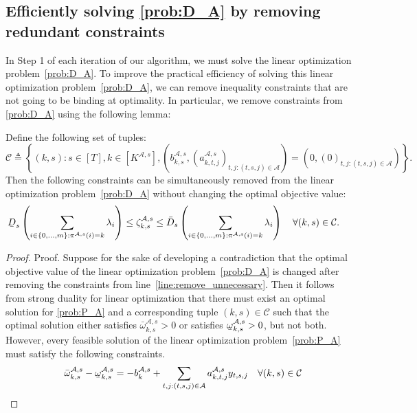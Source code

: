 \documentclass[nonblindrev,mnsc]{informs3} %
\newcommand{\ubar}[1]{\text{\b{$#1$}}}
\begin{document}
\begin{APPENDICES}
\subsection{Efficiently solving \eqref{prob:D_A} by removing redundant constraints}\label{app:solveDA} 
In Step 1 of each iteration of our algorithm, we must solve the linear optimization problem~\eqref{prob:D_A}. To improve the practical efficiency of solving this linear optimization problem~\eqref{prob:D_A}, we can remove inequality constraints that are not going to be binding at optimality. In particular, we remove constraints from \eqref{prob:D_A} using the following lemma:
\begin{lemma} \label{lem:remove_unnecessary}
Define the following set of tuples:
$$\mathcal{C} \triangleq \left \{(k,s): s \in [T], k \in [K^{\mathcal{A},s}], \left({b}^{\mathcal{A},s}_{ k,s}, \left( a^{\mathcal{A},s}_{k,t,j} \right)_{t,j: (t,s,j) \in \mathcal{A}}\right) = \left(0,(0)_{t,j: (t,s,j) \in \mathcal{A}} \right)  \right \}. $$
Then the following constraints can be simultaneously removed from the linear optimization problem~\eqref{prob:D_A} without changing the optimal objective value:
\begin{align}
    &  \ubar{D}_s \left( \sum_{i \in \{0,\ldots,m\}: \pi^{\mathcal{A},s}(i) = k} \lambda_{i} \right)   \le \zeta^{\mathcal{A},s}_{k,s}  \le \bar{D}_s \left( \sum_{i \in \{0,\ldots,m\}: \pi^{\mathcal{A},s}(i) = k} \lambda_{i} \right)  \quad  \forall  (k,s) \in \mathcal{C}.  \label{line:remove_unnecessary} 
\end{align}
\end{lemma}
\begin{proof}{Proof.}
Suppose for the sake of developing a contradiction that the optimal objective value of the linear optimization problem~\eqref{prob:D_A} is changed after removing the constraints from line~\eqref{line:remove_unnecessary}. Then it follows from strong duality for linear optimization that there must exist an optimal solution for \eqref{prob:P_A} and a corresponding tuple $(k,s) \in \mathcal{C}$ such that the optimal solution either satisfies $\bar{\omega}^{\mathcal{A},s}_{k,s} > 0$ or satisfies $\ubar{\omega}^{\mathcal{A},s}_{k,s}> 0$, but not both. However, every   feasible solution of the linear optimization problem~\eqref{prob:P_A} must satisfy  the following constraints. 
\begin{align*}
\begin{aligned}
        &&&\bar{\omega}^{\mathcal{A},s}_{k,s}  - \ubar{\omega}^{\mathcal{A},s}_{k,s}  =   - b^{\mathcal{A},s}_{k} + \sum_{t,j: (t,s,j) \in \mathcal{A}} a_{k,t,j}^{\mathcal{A},s} y_{t,s,j} && \forall (k,s) \in \mathcal{C}  \\

\end{aligned}
\end{align*}
\end{proof}
\end{APPENDICES}
\end{document}
